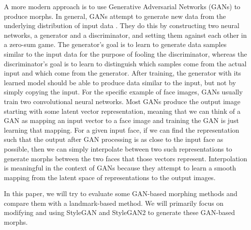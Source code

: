 \documentclass[12pt,twocolumn]{paper}
\begin{document}
\par
A more modern approach is to use Generative Adversarial Networks (GANs) to produce morphs. In general, GANs attempt to generate new data from the underlying distribution of input data \cite{goodfellow2014generative}. They do this by constructing two neural networks, a generator and a discriminator, and setting them against each other in a zero-sum game. The generator's goal is to learn to generate data samples similar to the input data for the purpose of fooling the discriminator, whereas the discriminator's goal is to learn to distinguish which samples come from the actual input and which come from the generator. After training, the generator with its learned model should be able to produce data similar to the input, but not by simply copying the input. For the specific example of face images, GANs usually train two convolutional neural networks. Most GANs produce the output image starting with some latent vector representation, meaning that we can think of a GAN as mapping an input vector to a face image and training the GAN is just learning that mapping. For a given input face, if we can find the representation such that the output after GAN processing is as close to the input face as possible, then we can simply interpolate between two such representations to generate morphs between the two faces that those vectors represent. Interpolation is meaningful \cite{abdal2019image2stylegan} in the context of GANs because they attempt to learn a smooth mapping from the latent space of representations to the output images.
\par
In this paper, we will try to evaluate some GAN-based morphing methods and compare them with a landmark-based method. We will primarily focus on modifying and using StyleGAN and StyleGAN2 to generate these GAN-based morphs.
\end{document}
